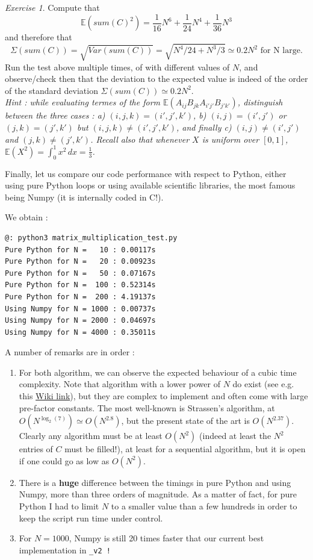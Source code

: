 \documentclass[12pt]{article}
\theoremstyle{plain}
\theoremstyle{remark}
\newtheorem{exercise}{Exercise}
\newcommand{\boE}{\mathbb{E}}
\begin{document}
\begin{exercise} Compute that
$$
\boE(sum(C)^2) = \frac{1}{16}N^6 + \frac{1}{24}N^4 + \frac{1}{36}N^3
$$
and therefore that 
$$
\Sigma(sum(C)) = \sqrt{Var(sum(C))} = \sqrt{N^4/24 + N^3/3} \simeq 0.2 N^2
\text{ for N large}.
$$
Run the test above multiple times, of with different values of $N$, and
observe/check then that the deviation to the expected value is indeed 
of the order of the standard deviation $\Sigma(sum(C)) \simeq 0.2 N^2$.\\
{\it Hint : while evaluating termes of the form
$\boE(A_{ij}B_{jk}A_{i'j'}B_{j'k'})$, distinguish between the three cases : 
a) $(i,j,k) = (i',j',k')$, b) $(i,j) = (i',j')$ or $(j,k)=(j',k')$ but $(i,j,k)
\neq (i',j',k')$, and finally c) $(i,j) \neq (i',j')$ and $(j,k) \neq (j',k')$. 
Recall also that whenever $X$ is uniform over $[0,1]$, $\boE(X^2) = 
\int_0^1 x^2\, dx = \frac{1}{3}$.} 
\end{exercise}

\medskip

Finally, let us compare our code performance with respect to Python, either
using pure Python loops or using available scientific libraries, the most
famous being Numpy (it is internally coded in C!).



We obtain :  

\begin{lstlisting}[style=bash]
@: python3 matrix_multiplication_test.py
Pure Python for N =   10 : 0.00117s
Pure Python for N =   20 : 0.00923s
Pure Python for N =   50 : 0.07167s
Pure Python for N =  100 : 0.52314s
Pure Python for N =  200 : 4.19137s
Using Numpy for N = 1000 : 0.00737s
Using Numpy for N = 2000 : 0.04697s
Using Numpy for N = 4000 : 0.35011s
\end{lstlisting}

A number of remarks are in order :
\begin{enumerate}
\item
For both algorithm, we can observe the expected behaviour of a cubic time
complexity. Note that algorithm with a lower power of $N$ do exist (see e.g. 
this \href{https://en.wikipedia.org/wiki/Computational_complexity_of_matrix_multiplication}{Wiki link}),
but they are complex to implement and often come with large pre-factor
constants. The most well-known is Strassen's algorithm, at $O(N^{\log_2(7)})
\simeq O(N^{2.8})$, but the present state of the art is $O(N^{2.37})$. Clearly 
any algorithm must be at least $O(N^2)$ (indeed at least the $N^2$ entries of
$C$ must be filled!), at least for a sequential algorithm, but it is open if 
one could go as low as $O(N^2)$.
\item
There is a {\bf huge} difference between the timings in pure Python and using
Numpy, more than three orders of magnitude. As a matter of fact, for pure Python I 
had to limit $N$ to a smaller value than a few hundreds in order to keep the script run 
time under control.
\item 
For $N = 1000$, Numpy is still 20 times faster that our current best
implementation in \tt{\_v2} !
\end{enumerate}
\end{document}
